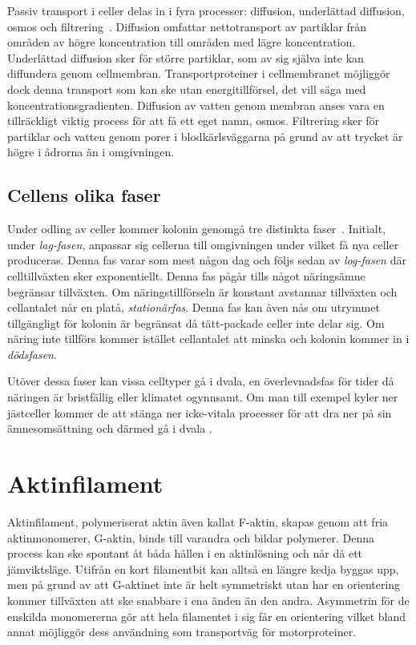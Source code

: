 Passiv transport i celler delas in i fyra processer: diffusion, underlättad diffusion, osmos och filtrering~\cite{Cram_Passivetransport}. Diffusion omfattar nettotransport av partiklar från områden av högre koncentration till områden med lägre koncentration. Underlättad diffusion sker för större partiklar, som av sig själva inte kan diffundera genom cellmembran. Transportproteiner i cellmembranet möjliggör dock denna transport som kan ske utan energitillförsel, det vill säga med koncentrationsgradienten. Diffusion av vatten genom membran anses vara en tillräckligt viktig process för att få ett eget namn, osmos. Filtrering sker för partiklar och vatten genom  porer i blodkärlsväggarna på grund av att trycket är högre i ådrorna än i omgivningen.


\subsection{Cellens olika faser}

Under odling av celler kommer kolonin genomgå tre distinkta faser~\cite{Heidcamp_Cellfas}. Initialt, under \emph{lag-fasen}, anpassar sig cellerna till omgivningen under vilket få nya celler produceras. Denna fas varar som mest någon dag och följs sedan av \emph{log-fasen} där celltillväxten sker exponentiellt. Denna fas pågår tills något näringsämne begränsar tillväxten. Om näringstillförseln är konstant avstannar tillväxten och cellantalet når en platå, \emph{stationärfas}. Denna fas kan även nås om utrymmet tillgängligt för kolonin är begränsat då tätt-packade celler inte delar sig. 
Om näring inte tillförs kommer istället cellantalet att minska och kolonin kommer in i \emph{dödsfasen}.

Utöver dessa faser kan vissa celltyper gå i dvala, en överlevnadsfas för tider då näringen är bristfällig eller klimatet ogynnsamt. Om man till exempel kyler ner jästceller kommer de att stänga ner icke-vitala processer för att dra ner på sin ämnesomsättning och därmed gå i dvala \cite{Postma_Dvala2009}. 


\section{Aktinfilament}

Aktinfilament, polymeriserat aktin även kallat F-aktin, skapas genom att fria aktinmonomerer, G-aktin, binds till varandra och bildar polymerer. Denna process kan ske spontant åt båda hållen i en aktinlösning och når då ett jämviktsläge. Utifrån en kort filamentbit kan alltså en längre kedja byggas upp, men på grund av att G-aktinet inte är helt symmetriskt utan har en orientering kommer tillväxten att ske snabbare i ena änden än den andra. Asymmetrin för de enskilda monomererna gör att hela filamentet i sig får en orientering vilket bland annat möjliggör dess användning som transportväg för motorproteiner. %

